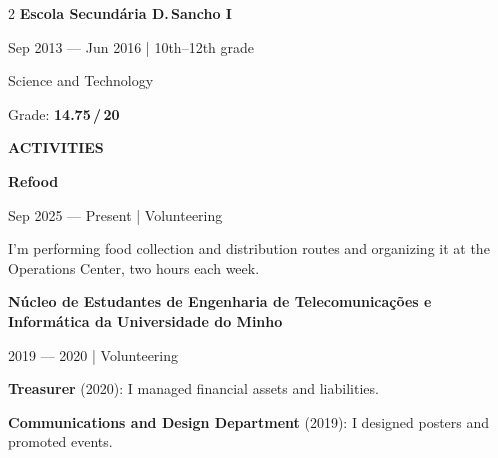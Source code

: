 \documentclass[10pt,a4paper]{article}
\newcommand{\currentsectioncolor}{sec-about-me}
\newcommand{\cvsectiontitle}[2]{%
  \vspace{10pt}%
  {\large\bfseries\addfontfeatures{LetterSpace=5}\color{#1}\MakeUppercase{#2}}\par
  \vspace{-3pt}{\color{#1}\rule{\linewidth}{1.35pt}}\par\vspace{10pt}%
  \gdef\currentsectioncolor{#1}%
}
\newcommand{\entrytitlesize}{\normalsize\bfseries}
\newcommand{\stackentry}[3]{%
  {\entrytitlesize\color{textprimary}#1}\par
  {\footnotesize\color{textmuted}#2}\par
  \vspace{0.5pt}%
  #3%
  \par\vspace{5pt}%
}
\begin{document}
\begin{paracol}{2}
  \stackentry
    {Escola Secund\'aria D.\,Sancho I}
    {Sep 2013 --- Jun 2016 \textcolor{textmuted}{|} 10th--12th grade}
    {\begin{cvbullets}
      \item Science and Technology
      \item Grade: \textbf{14.75\,/\,20}
    \end{cvbullets}}

  \cvsectiontitle{sec-activities}{Activities}

  \stackentry
    {Refood}
    {Sep 2025 --- Present \textcolor{textmuted}{|} Volunteering}
    {\begin{cvbullets}
      \item I'm performing food collection and distribution routes and organizing it at the Operations Center, two hours each week.
    \end{cvbullets}}

  \stackentry
    {N\'ucleo de Estudantes de Engenharia de Telecomunica\c{c}\~oes e Inform\'atica da Universidade do Minho}
    {2019 --- 2020 \textcolor{textmuted}{|} Volunteering}
    {\begin{cvbullets}
      \item \textbf{Treasurer} \textcolor{textmuted}{(2020)}: I managed financial assets and liabilities.
      \item \textbf{Communications and Design Department} \textcolor{textmuted}{(2019)}: I designed posters and promoted events.
    \end{cvbullets}}
\end{paracol}

\newpage
\end{document}
